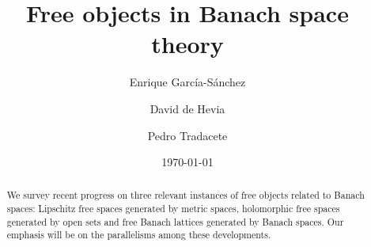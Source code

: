 \documentclass[12pt,leqno]{amsart}
\title{Free objects in Banach space theory}
\author[E. Garc\'ia-S\'anchez]{Enrique Garc\'ia-S\'anchez}
\author[D. de Hevia]{David de Hevia}
\author[P.~Tradacete]{Pedro Tradacete}
\date{\today}
\numberwithin{equation}{section} %
\theoremstyle{definition}
\numberwithin{equation}{section}
\begin{document}
\begin{abstract}
    We survey recent progress on three relevant instances of free objects related to Banach spaces: Lipschitz free spaces generated by metric spaces, holomorphic free spaces generated by open sets and free Banach lattices generated by Banach spaces. Our emphasis will be on the parallelisms among these developments.
\end{abstract}

\maketitle

\end{document}
